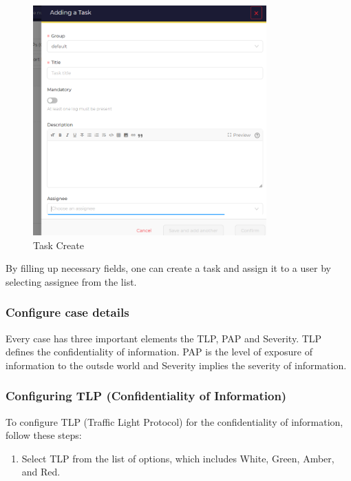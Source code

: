 \documentclass{article}
\begin{document}
\begin{figure}[H]
    \centering
    \includegraphics[width=0.8\textwidth]{addTask2.png}
    \caption{Task Create}
    \label{fig:taskcreate1}
\end{figure}

By filling up necessary fields, one can create a task and assign it to a user by selecting assignee from the list.\\

\subsubsection*{Configure case details}

Every case has three important elements the TLP, PAP and Severity. TLP defines the confidentiality of information. PAP is the level of exposure of information to the outsde world and Severity implies the severity of information.

\subsubsection*{Configuring TLP (Confidentiality of Information)}

To configure TLP (Traffic Light Protocol) for the confidentiality of information, follow these steps:

\begin{enumerate}
  \item Select TLP from the list of options, which includes White, Green, Amber, and Red.
\end{enumerate}
\end{document}
